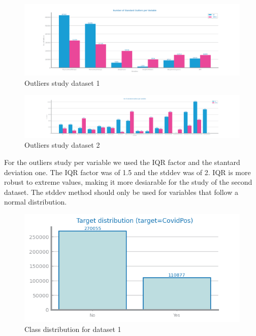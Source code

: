 \documentclass[10pt]{extarticle}
\begin{document}
\begin{figure}[H]
\centering\includegraphics[scale=0.60]{images/dataset1/data_profiling/CovidPos_outliers_standard.png}
\caption{Outliers study dataset 1}
\end{figure}

\begin{figure}[H]
\centering\includegraphics[scale=0.60]{images/dataset2/data_profiling/Credit_Score_outliers_standard.png}
\caption{Outliers study dataset 2}
\end{figure}
For the outliers study per variable we used the IQR factor and the stantard deviation one. The IQR factor was of 1.5 and the 
stddev was of 2. %
IQR is more robust to extreme values, making it more desiarable for the study of the second dataset. The stddev method should only be
used for variables that follow a normal distribution.

\begin{figure}[H]
\centering\includegraphics[scale=0.95]{images/dataset1/data_profiling/CovidPos_class_distribution.png}
\caption{Class distribution for dataset 1}
\end{figure}
\end{document}
